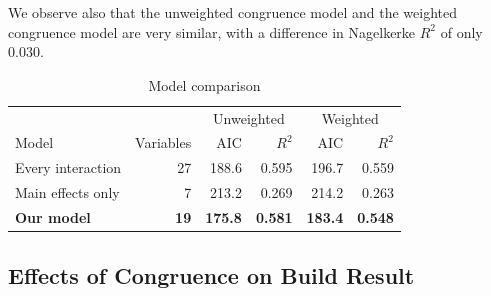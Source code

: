 We observe also that the unweighted congruence model and the weighted congruence model are very similar, with a difference in Nagelkerke $R^2$ of only 0.030.

\begin{table}[t]
\begin{center}
\begin{tabular}{l|r|rr|rr}

             & & \multicolumn{2}{c|}{Unweighted} & \multicolumn{2}{c}{Weighted} \\
Model                  & Variables    & AIC & $R^2$                       & AIC & $R^2$                      \\ \hline
Every interaction  & 27  & 188.6 & 0.595 & 196.7 & 0.559 \\
Main effects only & 7   & 213.2 & 0.269 & 214.2 & 0.263 \\
\textbf{Our model}         & \textbf{19}  & \textbf{175.8} & \textbf{0.581} & \textbf{183.4} & \textbf{0.548} \\
\hline
\end{tabular}
\end{center}
\caption{Model comparison}
\label{tab:models}
\end{table}












\subsection{Effects of Congruence on Build Result}
\label{sec:congruence_effect_build_result}



